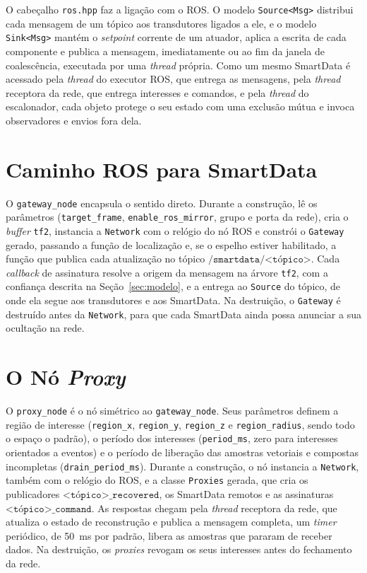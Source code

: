 \documentclass[
    12pt,
    oneside,
    a4paper,
    chapter=TITLE,
    section=TITLE,
    english,
    brazil
]{abntex2}
\begin{document}
O cabeçalho \texttt{ros.hpp} faz a ligação com o ROS. O modelo
\texttt{Source<Msg>} distribui cada mensagem de um tópico aos transdutores
ligados a ele, e o modelo \texttt{Sink<Msg>} mantém o \textit{setpoint}
corrente de um atuador, aplica a escrita de cada componente e publica a
mensagem, imediatamente ou ao fim da janela de coalescência, executada
por uma \textit{thread} própria. Como um mesmo SmartData é acessado pela
\textit{thread} do executor ROS, que entrega as mensagens, pela
\textit{thread} receptora da rede, que entrega interesses e comandos, e
pela \textit{thread} do escalonador, cada objeto protege o seu estado com
uma exclusão mútua e invoca observadores e envios fora dela.

\section{Caminho ROS para SmartData}
\label{sec:gateway-impl}

O \texttt{gateway\_node} encapsula o sentido direto. Durante a construção,
lê os parâmetros (\texttt{target\_frame}, \texttt{enable\_ros\_mirror},
grupo e porta da rede), cria o \textit{buffer} \texttt{tf2}, instancia a
\texttt{Network} com o relógio do nó ROS e constrói o \texttt{Gateway}
gerado, passando a função de localização e, se o espelho estiver
habilitado, a função que publica cada atualização no tópico
\(\texttt{/smartdata/<tópico>}\). Cada \textit{callback} de assinatura
resolve a origem da mensagem na árvore \texttt{tf2}, com a confiança
descrita na Seção~\ref{sec:modelo}, e a entrega ao \texttt{Source} do
tópico, de onde ela segue aos transdutores e aos SmartData. Na destruição,
o \texttt{Gateway} é destruído antes da \texttt{Network}, para que cada
SmartData ainda possa anunciar a sua ocultação na rede.

\section{O Nó \textit{Proxy}}
\label{sec:proxy-impl}

O \texttt{proxy\_node} é o nó simétrico ao \texttt{gateway\_node}. Seus
parâmetros definem a região de interesse (\texttt{region\_x},
\texttt{region\_y}, \texttt{region\_z} e \texttt{region\_radius}, sendo
todo o espaço o padrão), o período dos interesses (\texttt{period\_ms},
zero para interesses orientados a eventos) e o período de liberação das
amostras vetoriais e compostas incompletas (\texttt{drain\_period\_ms}).
Durante a construção, o nó instancia a \texttt{Network}, também com o
relógio do ROS, e a classe \texttt{Proxies} gerada, que cria os
publicadores \(\texttt{<tópico>\_recovered}\), os SmartData remotos e as
assinaturas \(\texttt{<tópico>\_command}\). As respostas chegam pela
\textit{thread} receptora da rede, que atualiza o estado de reconstrução e
publica a mensagem completa, um \textit{timer} periódico, de
\SI{50}{\milli\second} por padrão, libera as amostras que pararam de
receber dados. Na destruição, os \textit{proxies} revogam os seus
interesses antes do fechamento da rede.
\end{document}
